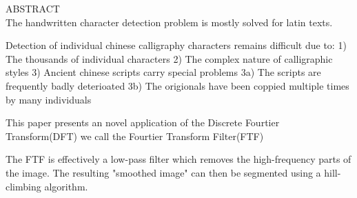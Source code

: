ABSTRACT\\

The handwritten character detection problem is mostly solved for latin texts.

Detection of individual chinese calligraphy characters remains difficult due to:
    1)  The thousands of individual characters
    2)  The complex nature of calligraphic styles
    3)  Ancient chinese scripts carry special problems
        3a) The scripts are frequently badly deterioated
        3b) The origionals have been coppied multiple times by many individuals
        
This paper presents an novel application of the Discrete Fourtier Transform(DFT) we call the Fourtier Transform Filter(FTF)

The FTF is effectively a low-pass filter which removes the high-frequency parts of the image.  The resulting "smoothed image" can then be segmented using a hill-climbing algorithm.

\newpage
